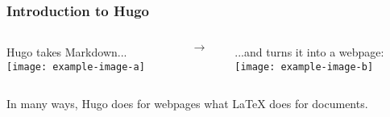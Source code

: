 \begin{frame}
    \frametitle{Introduction to Hugo}

    \begin{columns}
        \begin{column}{.45\textwidth}
            Hugo takes Markdown... \ \\
            \bigskip
            \texttt{[image: example-image-a]}
        \end{column}
        \pause
        \begin{column}{.1\textwidth}
            $$ \to $$
        \end{column}
        \begin{column}{.45\textwidth}
            ...and turns it into a webpage: \ \\
            \bigskip
            \texttt{[image: example-image-b]}
        \end{column}
    \end{columns}

    \pause
    \vfill

    In many ways, Hugo does for webpages what \LaTeX \: does for documents.
    
\end{frame}